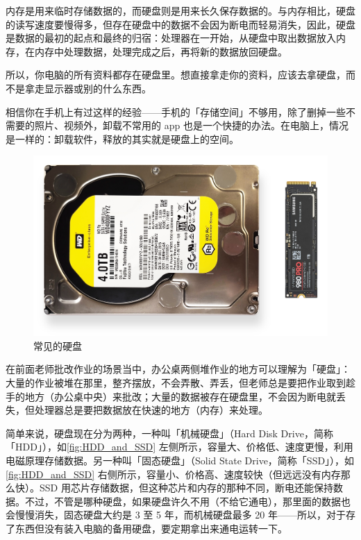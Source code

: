 内存是用来临时存储数据的，而硬盘则是用来长久保存数据的。与内存相比，硬盘的读写速度要慢得多，但存在硬盘中的数据不会因为断电而轻易消失，因此，硬盘是数据的最初的起点和最终的归宿：处理器在一开始，从硬盘中取出数据放入内存，在内存中处理数据，处理完成之后，再将新的数据放回硬盘。

\begin{note}
  所以，你电脑的所有资料都存在硬盘里。想直接拿走你的资料，应该去拿硬盘，而不是拿走显示器或别的什么东西。
\end{note}

相信你在手机上有过这样的经验——手机的「存储空间」不够用，除了删掉一些不需要的照片、视频外，卸载不常用的 app 也是一个快捷的办法。在电脑上，情况是一样的：卸载软件，释放的其实就是硬盘上的空间。

\begin{figure}[htb!]
  \centering
  \includegraphics[width=.8\textwidth]{assets/basic/HDD_and_SSD.png}
  \caption{常见的硬盘}
  \label{fig:HDD_and_SSD}
\end{figure}

在前面老师批改作业的场景当中，办公桌两侧堆作业的地方可以理解为「硬盘」：大量的作业被堆在那里，整齐摆放，不会弄散、弄丢，但老师总是要把作业取到趁手的地方（办公桌中央）来批改；大量的数据被存在硬盘里，不会因为断电就丢失，但处理器总是要把数据放在快速的地方（内存）来处理。

简单来说，硬盘现在分为两种，一种叫「机械硬盘」（Hard Disk Drive，简称「HDD」），如\autoref{fig:HDD_and_SSD} 左侧所示，容量大、价格低、速度更慢，利用电磁原理存储数据。另一种叫「固态硬盘」（Solid State Drive，简称「SSD」），如\autoref{fig:HDD_and_SSD} 右侧所示，容量小、价格高、速度较快（但远远没有内存那么快）。SSD 用芯片存储数据，但这种芯片和内存的那种不同，断电还能保持数据。不过，不管是哪种硬盘，如果硬盘许久不用（不给它通电），那里面的数据也会慢慢消失，固态硬盘大约是 3 至 5 年，而机械硬盘最多 20 年——所以，对于存了东西但没有装入电脑的备用硬盘，要定期拿出来通电运转一下。

